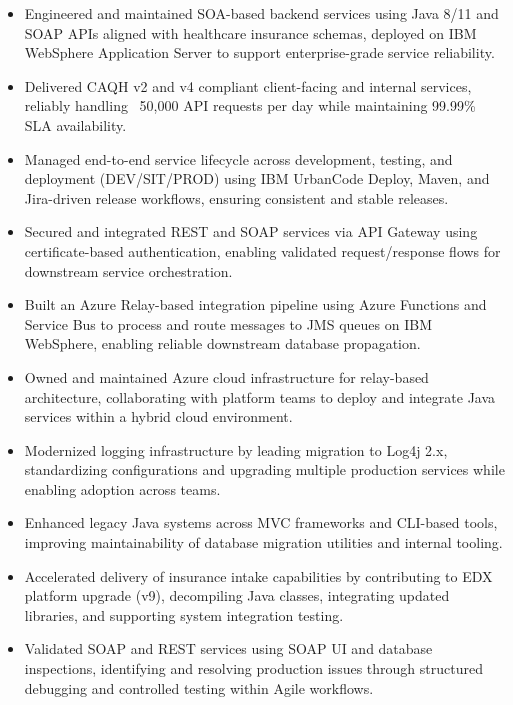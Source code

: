 \documentclass[11pt]{article}
\begin{document}
\begin{itemize}[leftmargin=15pt,itemsep=-6pt]
\item Engineered and maintained SOA-based backend services using Java 8/11 and SOAP APIs aligned with healthcare insurance schemas, deployed on IBM WebSphere Application Server to support enterprise-grade service reliability.

\item Delivered CAQH v2 and v4 compliant client-facing and internal services, reliably handling ~50{,}000 API requests per day while maintaining 99.99\% SLA availability.

\item Managed end-to-end service lifecycle across development, testing, and deployment (DEV/SIT/PROD) using IBM UrbanCode Deploy, Maven, and Jira-driven release workflows, ensuring consistent and stable releases.

\item Secured and integrated REST and SOAP services via API Gateway using certificate-based authentication, enabling validated request/response flows for downstream service orchestration.

\item Built an Azure Relay-based integration pipeline using Azure Functions and Service Bus to process and route messages to JMS queues on IBM WebSphere, enabling reliable downstream database propagation.

\item Owned and maintained Azure cloud infrastructure for relay-based architecture, collaborating with platform teams to deploy and integrate Java services within a hybrid cloud environment.

\item Modernized logging infrastructure by leading migration to Log4j 2.x, standardizing configurations and upgrading multiple production services while enabling adoption across teams.

\item Enhanced legacy Java systems across MVC frameworks and CLI-based tools, improving maintainability of database migration utilities and internal tooling.

\item Accelerated delivery of insurance intake capabilities by contributing to EDX platform upgrade (v9), decompiling Java classes, integrating updated libraries, and supporting system integration testing.

\item Validated SOAP and REST services using SOAP UI and database inspections, identifying and resolving production issues through structured debugging and controlled testing within Agile workflows.
\end{itemize}
\end{document}
